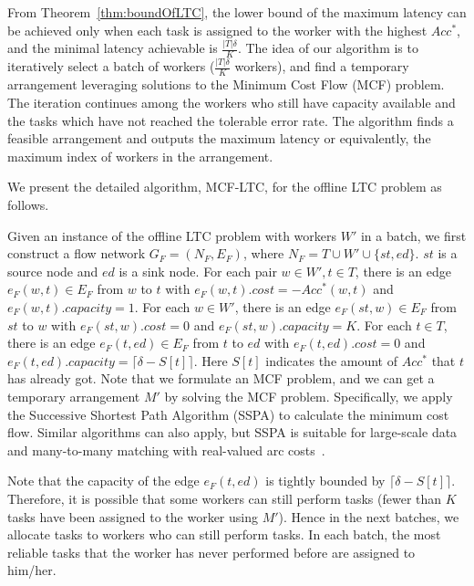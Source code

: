 From Theorem~\ref{thm:boundOfLTC}, the lower bound of the maximum latency can be achieved only when each task is assigned to the worker with the highest $Acc^*$, and the minimal latency achievable is $\frac{|T|\delta}{K}$.
The idea of our algorithm is to iteratively select a batch of workers (\eg $\frac{|T|\delta}{K}$ workers), and find a temporary arrangement leveraging solutions to the Minimum Cost Flow (MCF) problem.
The iteration continues among the workers who still have capacity available and the tasks which have not reached the tolerable error rate.
The algorithm finds a feasible arrangement and outputs the maximum latency or equivalently, the maximum index of workers in the arrangement.

We present the detailed algorithm, MCF-LTC, for the offline LTC problem as follows.

Given an instance of the offline LTC problem with workers $W'$ in a batch, we first construct a flow network $G_F = (N_F, E_F)$, where $N_F = T \cup W' \cup \{st, ed\}$.
$st$ is a source node and $ed$ is a sink node.
For each pair $w \in W', t \in T$, there is an edge $e_F(w, t) \in E_F$ from $w$ to $t$ with $e_F(w, t).cost = -Acc^*(w, t)$ and $e_F(w, t).capacity = 1$.
For each $w \in W'$, there is an edge $e_F(st, w) \in E_F$ from $st$ to $w$ with $e_F(st, w).cost = 0$ and $e_F(st, w).capacity = K$.
For each $t \in T$, there is an edge $e_F(t, ed) \in E_F$ from $t$ to $ed$ with $e_F(t, ed).cost = 0$ and $e_F(t, ed).capacity = \lceil \delta-S[t] \rceil$.
Here $S[t]$ indicates the amount of $Acc^*$ that $t$ has already got.
Note that we formulate an MCF problem, and we can get a temporary arrangement $M'$ by solving the MCF problem.
Specifically, we apply the Successive Shortest Path Algorithm (SSPA) to calculate the minimum cost flow.
Similar algorithms can also apply, but SSPA is suitable for large-scale data and many-to-many matching with real-valued arc costs~\cite{yiu2008capacity}.

Note that the capacity of the edge $e_F(t, ed)$ is tightly bounded by $\lceil \delta-S[t] \rceil$.
Therefore, it is possible that some workers can still perform tasks (\ie fewer than $K$ tasks have been assigned to the worker using $M'$).
Hence in the next batches, we allocate tasks to workers who can still perform tasks.
In each batch, the most reliable tasks that the worker has never performed before are assigned to him/her.

